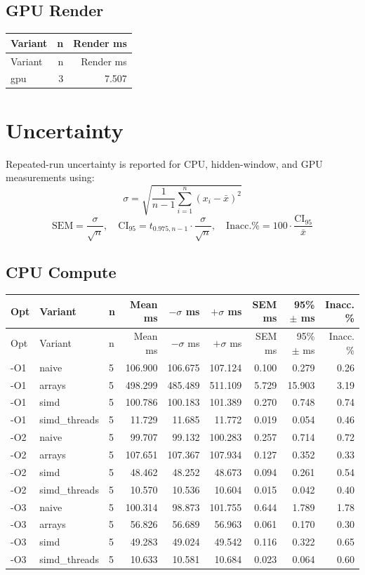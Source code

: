 \documentclass[11pt]{article}
\begin{document}
\subsection*{GPU Render}
\begin{longtable}{lrr}
Variant & n & Render ms \\ \hline
\endfirsthead
Variant & n & Render ms \\ \hline
\endhead
gpu & 3 & 7.507 \\
\end{longtable}

\section*{Uncertainty}
Repeated-run uncertainty is reported for CPU, hidden-window, and GPU measurements using:
\[
\sigma = \sqrt{\frac{1}{n - 1} \sum_{i=1}^{n} (x_i - \bar{x})^2}
\]
\[
\mathrm{SEM} = \frac{\sigma}{\sqrt{n}}, \quad
\mathrm{CI}_{95} = t_{0.975, n-1} \cdot \frac{\sigma}{\sqrt{n}}, \quad
\mathrm{Inacc.\%} = 100 \cdot \frac{\mathrm{CI}_{95}}{\bar{x}}
\]

\subsection*{CPU Compute}
\begin{longtable}{lllrrrrrr}
Opt & Variant & n & Mean ms & $-\sigma$ ms & $+\sigma$ ms & SEM ms & 95\% $\pm$ ms & Inacc. \% \\ \hline
\endfirsthead
Opt & Variant & n & Mean ms & $-\sigma$ ms & $+\sigma$ ms & SEM ms & 95\% $\pm$ ms & Inacc. \% \\ \hline
\endhead
-O1 & naive & 5 & 106.900 & 106.675 & 107.124 & 0.100 & 0.279 & 0.26 \\
-O1 & arrays & 5 & 498.299 & 485.489 & 511.109 & 5.729 & 15.903 & 3.19 \\
-O1 & simd & 5 & 100.786 & 100.183 & 101.389 & 0.270 & 0.748 & 0.74 \\
-O1 & simd\_threads & 5 & 11.729 & 11.685 & 11.772 & 0.019 & 0.054 & 0.46 \\
-O2 & naive & 5 & 99.707 & 99.132 & 100.283 & 0.257 & 0.714 & 0.72 \\
-O2 & arrays & 5 & 107.651 & 107.367 & 107.934 & 0.127 & 0.352 & 0.33 \\
-O2 & simd & 5 & 48.462 & 48.252 & 48.673 & 0.094 & 0.261 & 0.54 \\
-O2 & simd\_threads & 5 & 10.570 & 10.536 & 10.604 & 0.015 & 0.042 & 0.40 \\
-O3 & naive & 5 & 100.314 & 98.873 & 101.755 & 0.644 & 1.789 & 1.78 \\
-O3 & arrays & 5 & 56.826 & 56.689 & 56.963 & 0.061 & 0.170 & 0.30 \\
-O3 & simd & 5 & 49.283 & 49.024 & 49.542 & 0.116 & 0.322 & 0.65 \\
-O3 & simd\_threads & 5 & 10.633 & 10.581 & 10.684 & 0.023 & 0.064 & 0.60 \\
\end{longtable}
\end{document}
